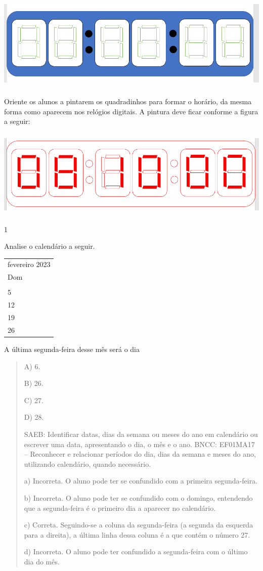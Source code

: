 \includegraphics[width=5.90556in,height=1.81944in]{media/image44.png}

Oriente os alunos a pintarem os quadradinhos para formar o
horário, da mesma forma como aparecem nos relógios digitais. A pintura
deve ficar conforme a figura a seguir:

\includegraphics[width=5.90556in,height=1.67639in]{media/image45.png}


\num{1}

Analise o calendário a seguir.

\begin{longtable}[]{@{}l@{}}
\toprule
fevereiro 2023\tabularnewline
Dom\tabularnewline
\tabularnewline
5\tabularnewline
12\tabularnewline
19\tabularnewline
26\tabularnewline
\bottomrule
\end{longtable}

A última segunda-feira desse mês será o dia

\begin{quote}
A) 6.

B) 26.

C) 27.

D) 28.

SAEB: Identificar datas, dias da semana ou meses do ano em
calendário ou escrever uma data, apresentando o dia, o mês e o ano.
BNCC: EF01MA17 -- Reconhecer e relacionar períodos do dia, dias da semana
e meses do ano, utilizando calendário, quando necessário.

a) Incorreta. O aluno pode ter se confundido com a primeira segunda-feira.

b) Incorreta. O aluno pode ter se confundido com o domingo, entendendo que
a segunda-feira é o primeiro dia a aparecer no calendário.

c) Correta. Seguindo-se a coluna da segunda-feira (a segunda da esquerda para a direita), a última linha dessa coluna é a que contém o número 27.

d) Incorreta. O aluno pode ter confundido a segunda-feira com o último
dia do mês.
\end{quote}

